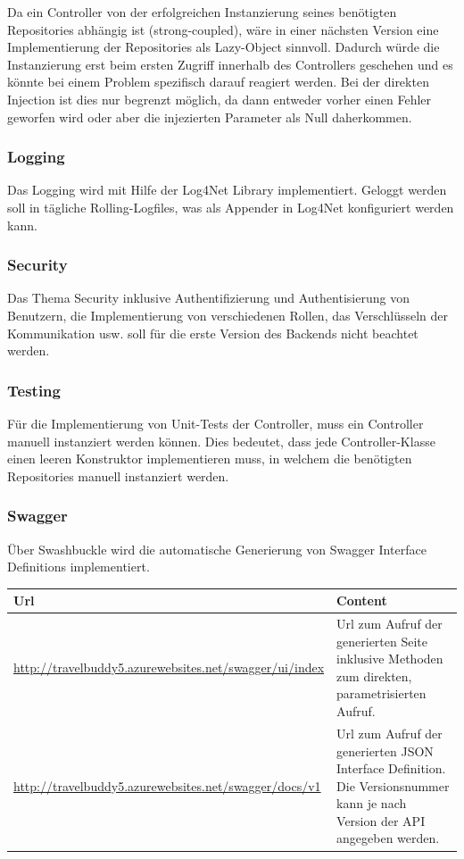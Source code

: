 \documentclass[a4paper,10pt,xetex]{article}
\begin{document}
Da ein Controller von der erfolgreichen Instanzierung seines ben\"otigten Repositories abh\"angig ist (strong-coupled),
w\"are in einer n\"achsten Version eine Implementierung der Repositories als Lazy-Object sinnvoll. Dadurch w\"urde die
Instanzierung erst beim ersten Zugriff innerhalb des Controllers geschehen und es k\"onnte bei einem Problem spezifisch
darauf reagiert werden. Bei der direkten Injection ist dies nur begrenzt m\"oglich, da dann entweder vorher einen Fehler
geworfen wird oder aber die injezierten Parameter als Null daherkommen.

\subsubsection{Logging}\label{logging}
Das Logging wird mit Hilfe der Log4Net Library implementiert. Geloggt werden soll in t\"agliche Rolling-Logfiles, was
als Appender in Log4Net konfiguriert werden kann.

\subsubsection{Security}\label{security}
Das Thema Security inklusive Authentifizierung und Authentisierung von Benutzern, die Implementierung von verschiedenen
Rollen, das Verschl\"usseln der Kommunikation usw. soll f\"ur die erste Version des Backends nicht beachtet werden.

\subsubsection{Testing}\label{testing}
F\"ur die Implementierung von Unit-Tests der Controller, muss ein Controller manuell instanziert werden k\"onnen. Dies
bedeutet, dass jede Controller-Klasse einen leeren Konstruktor implementieren muss, in welchem die ben\"otigten
Repositories manuell instanziert werden.

\subsubsection{Swagger}\label{swagger}
\"Uber Swashbuckle wird die automatische Generierung von Swagger Interface Definitions implementiert.

\begin{longtabu} to \textwidth { | l | X[l] | }
\hline
\textbf{Url} & \textbf{Content} \\
\hline
\endhead

\url{http://travelbuddy5.azurewebsites.net/swagger/ui/index} &
Url zum Aufruf der generierten Seite inklusive Methoden zum direkten, parametrisierten
  Aufruf.\\\hline
\url{http://travelbuddy5.azurewebsites.net/swagger/docs/v1} &
Url zum Aufruf der generierten JSON Interface Definition. Die Versionsnummer kann je nach
  Version der API angegeben werden.\\\hline
\end{longtabu}
\end{document}
